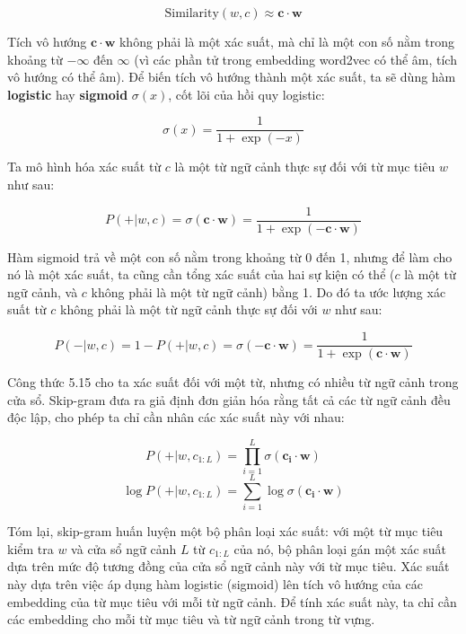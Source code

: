 \begin{equation}
\text{Similarity}(w,c) \approx \mathbf{c} \cdot \mathbf{w} \tag{5.13}
\end{equation}

Tích vô hướng $\mathbf{c} \cdot \mathbf{w}$ không phải là một xác suất, mà chỉ là một con số nằm trong khoảng từ $-\infty$ đến $\infty$ (vì các phần tử trong embedding word2vec có thể âm, tích vô hướng có thể âm). Để biến tích vô hướng thành một xác suất, ta sẽ dùng hàm \textbf{logistic} hay \textbf{sigmoid} $\sigma(x)$, cốt lõi của hồi quy logistic:

\begin{equation}
\sigma(x) = \frac{1}{1+\exp(-x)} \tag{5.14}
\end{equation}

Ta mô hình hóa xác suất từ $c$ là một từ ngữ cảnh thực sự đối với từ mục tiêu $w$ như sau:

\begin{equation}
P(+|w,c) = \sigma(\mathbf{c} \cdot \mathbf{w}) = \frac{1}{1+\exp(-\mathbf{c} \cdot \mathbf{w})} \tag{5.15}
\end{equation}

Hàm sigmoid trả về một con số nằm trong khoảng từ 0 đến 1, nhưng để làm cho nó là một xác suất, ta cũng cần tổng xác suất của hai sự kiện có thể ($c$ là một từ ngữ cảnh, và $c$ không phải là một từ ngữ cảnh) bằng 1. Do đó ta ước lượng xác suất từ $c$ không phải là một từ ngữ cảnh thực sự đối với $w$ như sau:

\begin{equation}
P(-|w,c) = 1-P(+|w,c) = \sigma(-\mathbf{c} \cdot \mathbf{w}) = \frac{1}{1+\exp(\mathbf{c} \cdot \mathbf{w})} \tag{5.16}
\end{equation}

Công thức 5.15 cho ta xác suất đối với một từ, nhưng có nhiều từ ngữ cảnh trong cửa sổ. Skip-gram đưa ra giả định đơn giản hóa rằng tất cả các từ ngữ cảnh đều độc lập, cho phép ta chỉ cần nhân các xác suất này với nhau:

\begin{equation}
P(+|w,c_{1:L}) = \prod_{i=1}^{L} \sigma(\mathbf{c_i} \cdot \mathbf{w}) \tag{5.17}
\end{equation}
\begin{equation}
\log P(+|w,c_{1:L}) = \sum_{i=1}^{L} \log \sigma(\mathbf{c_i} \cdot \mathbf{w}) \tag{5.18}
\end{equation}

Tóm lại, skip-gram huấn luyện một bộ phân loại xác suất: với một từ mục tiêu kiểm tra $w$ và cửa sổ ngữ cảnh $L$ từ $c_{1:L}$ của nó, bộ phân loại gán một xác suất dựa trên mức độ tương đồng của cửa sổ ngữ cảnh này với từ mục tiêu. Xác suất này dựa trên việc áp dụng hàm logistic (sigmoid) lên tích vô hướng của các embedding của từ mục tiêu với mỗi từ ngữ cảnh. Để tính xác suất này, ta chỉ cần các embedding cho mỗi từ mục tiêu và từ ngữ cảnh trong từ vựng.

